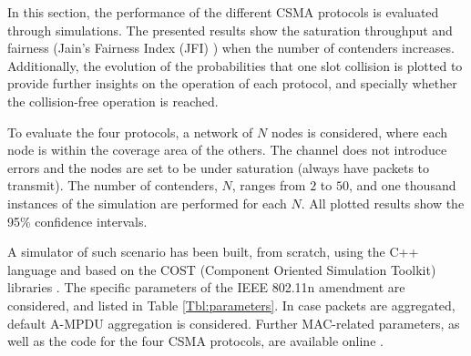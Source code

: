 \documentclass[conference]{IEEEtran}
\begin{document}
In this section, the performance of the different CSMA protocols is evaluated through simulations. The presented results show the saturation throughput and fairness (Jain's Fairness Index (JFI) \cite{jain1984quantitative}) when the number of contenders increases. Additionally, the evolution of the probabilities that one slot collision is plotted to provide further insights on the operation of each protocol, and specially whether the collision-free operation is reached. 


To evaluate the four protocols, a network of $N$ nodes is considered, where each node is within the coverage area of the others. The channel does not introduce errors and the nodes are set to be under saturation (always have packets to transmit). The number of contenders, $N$, ranges from $2$ to $50$, and one thousand instances of the simulation are performed for each $N$. All plotted results show the 95\% confidence intervals. 

A simulator of such scenario has been built, from scratch, using the C++ language and based on the COST (Component Oriented Simulation Toolkit) libraries \cite{yucesan2002cost}. The specific parameters of the IEEE 802.11n amendment \cite{IEEE80211n} are considered, and listed in Table \ref{Tbl:parameters}. In case packets are aggregated, default A-MPDU aggregation is considered. Further MAC-related parameters, as well as the code for the four CSMA protocols, are available online \cite{SanabriaSimulatorECA2012}.
\end{document}

